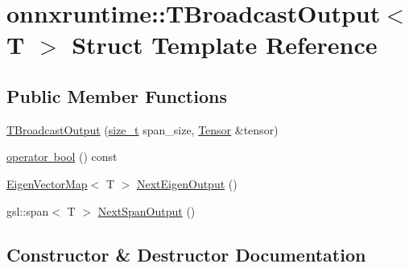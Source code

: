\hypertarget{structonnxruntime_1_1TBroadcastOutput}{}\section{onnxruntime\+:\+:T\+Broadcast\+Output$<$ T $>$ Struct Template Reference}
\label{structonnxruntime_1_1TBroadcastOutput}
\subsection*{Public Member Functions}
\begin{DoxyCompactItemize}
\item 
\mbox{\hyperlink{structonnxruntime_1_1TBroadcastOutput_a96a494a638c1ce71a49eeb3bf8c92ebc}{T\+Broadcast\+Output}} (\mbox{\hyperlink{mlasi_8h_a503efbc1c6e50825320ad909366b78ab}{size\+\_\+t}} span\+\_\+size, \mbox{\hyperlink{classonnxruntime_1_1Tensor}{Tensor}} \&tensor)
\item 
\mbox{\hyperlink{structonnxruntime_1_1TBroadcastOutput_a38d1cc8d50f4ccf6d39f8ac285e0b2d7}{operator bool}} () const
\item 
\mbox{\hyperlink{namespaceonnxruntime_ac267a13e3484233cf911a77bc106f099}{Eigen\+Vector\+Map}}$<$ T $>$ \mbox{\hyperlink{structonnxruntime_1_1TBroadcastOutput_a21141049895bc0c538be694381cd9645}{Next\+Eigen\+Output}} ()
\item 
gsl\+::span$<$ T $>$ \mbox{\hyperlink{structonnxruntime_1_1TBroadcastOutput_a7056a013eee7a4682a82da12b5f2f42f}{Next\+Span\+Output}} ()
\end{DoxyCompactItemize}


\subsection{Constructor \& Destructor Documentation}
\mbox{\label{structonnxruntime_1_1TBroadcastOutput_a96a494a638c1ce71a49eeb3bf8c92ebc}} 
